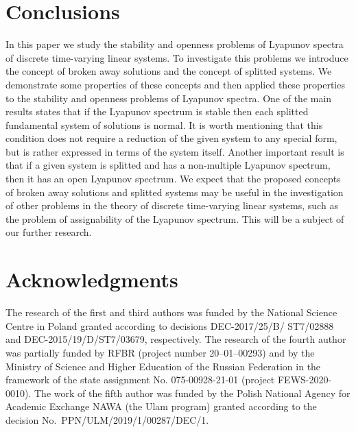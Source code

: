 \documentclass[11pt]{article}
\begin{document}
\section{Conclusions}

In this paper we study the 
stability and openness problems  of Lyapunov spectra
of discrete time-varying linear systems. To investigate this problems we
introduce the concept of broken away solutions and the concept of splitted
systems. We demonstrate some properties of these concepts and 
then applied these properties to the stability and openness problems
  of Lyapunov spectra. One of the main results states
that if the Lyapunov spectrum is stable then 
each splitted fundamental system of solutions is normal. It is 
worth mentioning that this condition does not require a reduction of 
the given system to any special form, but is rather expressed in terms of the system itself. 
Another important result is that if a given system is splitted and has a non-multiple Lyapunov spectrum, 
then it has an open Lyapunov spectrum. 
We expect that the proposed concepts of broken away solutions and splitted
systems may be useful 
in the investigation of other problems 
in the theory of
discrete time-varying linear systems, such as the problem of assignability of
the Lyapunov spectrum. This will be a subject of our further research.

\section*{Acknowledgments} 
The research of the first and third authors was funded by 
the National Science Centre in Poland granted according to decisions DEC-2017/25/B/ ST7/02888 and DEC-2015/19/D/ST7/03679, respectively. 
The research of the fourth author was partially funded by RFBR (project number 20--01--00293) 
and 
by the Ministry of Science and Higher Education of the Russian
Federation in the framework of the state assignment No. 075-00928-21-01 
(project FEWS-2020-0010). 
The work of the fifth author was funded by the Polish National Agency for Academic Exchange  NAWA (the Ulam program) 
granted according to the decision No.~PPN/ULM/2019/1/00287/DEC/1.





%
%
\end{document}
